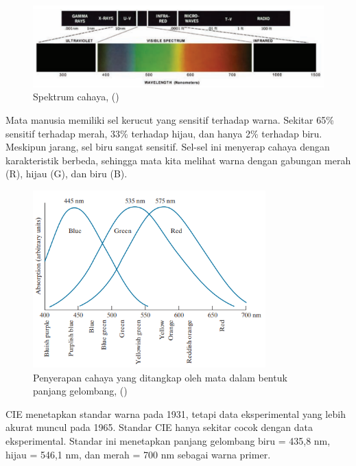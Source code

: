 \begin{figure}[H]
	\centering{}
	\includegraphics[width=\textwidth]{gambar/gelombang_cahaya.png}
	\caption{Spektrum cahaya, (\cite{Gonzalez:2018})}
\end{figure}

Mata manusia memiliki sel kerucut yang sensitif terhadap warna. Sekitar 65\% sensitif 
terhadap merah, 33\% terhadap hijau, dan hanya 2\% terhadap biru. Meskipun jarang, 
sel biru sangat sensitif. Sel-sel ini menyerap cahaya dengan karakteristik berbeda, 
sehingga mata kita melihat warna dengan gabungan merah (R), hijau (G), dan biru (B).

\begin{figure}[H]
	\centering{}
	\includegraphics[width=0.8\textwidth]{gambar/gelombang_rgb_mata.png}
	\caption{Penyerapan cahaya yang ditangkap oleh mata dalam bentuk panjang gelombang, (\cite{Gonzalez:2018})}
\end{figure}

CIE menetapkan standar warna pada 1931, tetapi data eksperimental yang lebih akurat 
muncul pada 1965. Standar CIE hanya sekitar cocok dengan data eksperimental. 
Standar ini menetapkan panjang gelombang biru = 435,8 nm, hijau = 546,1 nm, dan 
merah = 700 nm sebagai warna primer.

